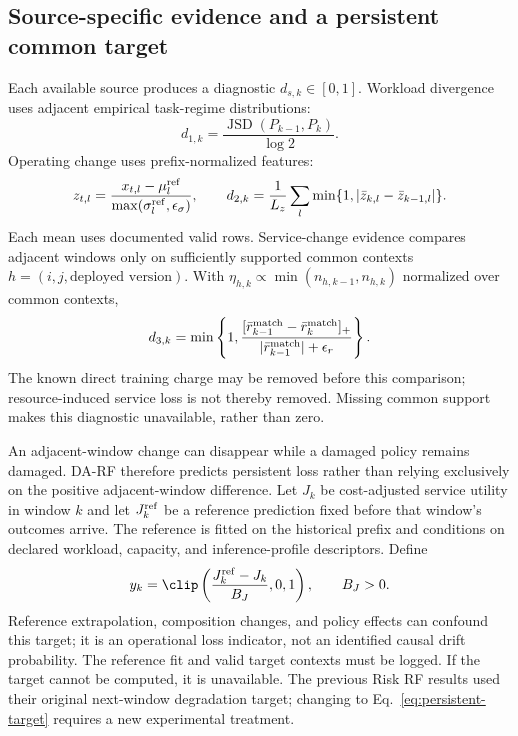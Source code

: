 \subsection{Source-specific evidence and a persistent common target}
\label{sec:evidence}

Each available source produces a diagnostic $d_{s,k}\in[0,1]$.
Workload divergence uses adjacent empirical task-regime distributions:
\begin{equation}
 d_{1,k}=\frac{\operatorname{JSD}(P_{k-1},P_k)}{\log 2}.
\end{equation}
Operating change uses prefix-normalized features:
\begin{equation}
 z_{t,l}=\frac{x_{t,l}-\mu_l^{\rm ref}}
                  {\max(\sigma_l^{\rm ref},\epsilon_\sigma)},
 \qquad
 d_{2,k}=\frac1{L_z}\sum_l\min\{1,|\bar z_{k,l}-\bar z_{k-1,l}|\}.
\end{equation}
Each mean uses documented valid rows. Service-change evidence compares
adjacent windows only on sufficiently supported common contexts
$h=(i,j,\text{deployed version})$. With
$\eta_{h,k}\propto\min(n_{h,k-1},n_{h,k})$ normalized over common contexts,
\begin{equation}
 d_{3,k}=\min\left\{1,
 \frac{[\bar r_{k-1}^{\rm match}-\bar r_k^{\rm match}]_+}
      {|\bar r_{k-1}^{\rm match}|+\epsilon_r}\right\}.
\end{equation}
The known direct training charge may be removed before this comparison;
resource-induced service loss is not thereby removed. Missing common support
makes this diagnostic unavailable, rather than zero.

An adjacent-window change can disappear while a damaged policy remains damaged.
DA-RF therefore predicts persistent loss rather than relying exclusively on the
positive adjacent-window difference. Let $J_k$ be cost-adjusted service utility
in window $k$ and let $J_k^{\rm ref}$ be a reference prediction fixed before
that window's outcomes arrive. The reference is fitted on the historical prefix
and conditions on declared workload, capacity, and inference-profile descriptors.
Define
\begin{equation}
 y_k=\clip\left(\frac{J_k^{\rm ref}-J_k}{B_J},0,1\right),\qquad B_J>0.
 \label{eq:persistent-target}
\end{equation}
Reference extrapolation, composition changes, and policy effects can confound
this target; it is an operational loss indicator, not an identified causal
drift probability. The reference fit and valid target contexts must be logged.
If the target cannot be computed, it is unavailable. The previous Risk RF
results used their original next-window degradation target; changing to
Eq.~\eqref{eq:persistent-target} requires a new experimental treatment.

